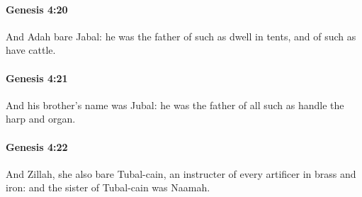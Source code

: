 		\paragraph{Genesis 4:20} %
			\label{GENESIS-4-20}

			And Adah bare Jabal: he was the father of such as dwell in tents, and of such as have cattle.


		\paragraph{Genesis 4:21} %
			\label{GENESIS-4-21}

			And his brother's name was Jubal: he was the father of all such as handle the harp and organ.


		\paragraph{Genesis 4:22} %
			\label{GENESIS-4-22}

			And Zillah, she also bare Tubal-cain, an instructer of every artificer in brass and iron: and the sister of Tubal-cain was Naamah.


